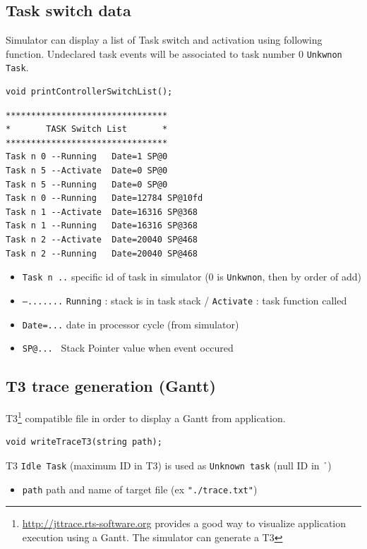 \subsection{Task switch data}
\noindent Simulator can display a list of Task switch and activation using following function. Undeclared task events will be associated to task number 0 {\tt  Unkwnon Task}.
\begin{lstlisting}
void printControllerSwitchList();
\end{lstlisting}

\begin{verbatim}
********************************
*       TASK Switch List       *
********************************
Task n 0 --Running   Date=1 SP@0
Task n 5 --Activate  Date=0 SP@0
Task n 5 --Running   Date=0 SP@0
Task n 0 --Running   Date=12784 SP@10fd
Task n 1 --Activate  Date=16316 SP@368
Task n 1 --Running   Date=16316 SP@368
Task n 2 --Activate  Date=20040 SP@468
Task n 2 --Running   Date=20040 SP@468
\end{verbatim}

 \begin{itemize}
	\item  {\tt Task n ..} specific id of task in simulator (0 is {\tt Unkwnon}, then by order of add)
	\item {\tt --.......}  {\tt Running} : stack is in task stack /   {\tt Activate} : task function called
	\item  {\tt Date=...} date in processor cycle (from simulator)
	\item  {\tt SP@... } Stack Pointer value when event occured
\end{itemize}

\subsection{T3 trace generation (Gantt)}
T3\footnote{\url{http://jttrace.rts-software.org} provides a good way to visualize application execution using a Gantt. The simulator can generate a T3} compatible file in order to display a Gantt from application.
\begin{lstlisting}
void writeTraceT3(string path);
\end{lstlisting}
T3 {\tt Idle Task} (maximum ID in T3) is used as {\tt Unknown task} (null ID in \h\ )
\begin{itemize}
	\item  {\tt path} path and name of target file (ex  {\tt "./trace.txt"})
\end{itemize}




